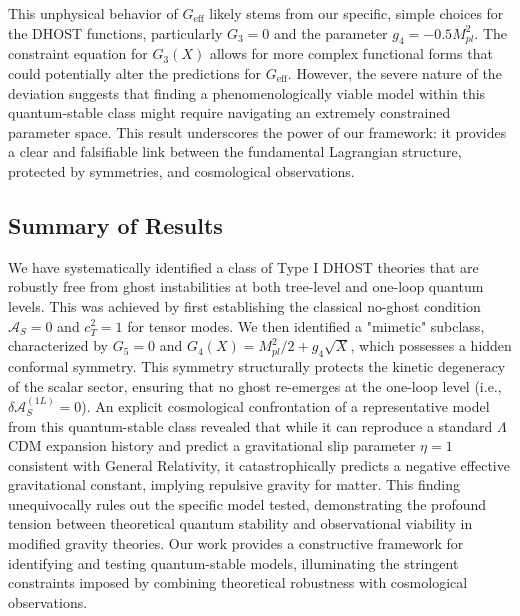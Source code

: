 \documentclass[twocolumn]{aastex631}
\begin{document}
This unphysical behavior of $G_{\text{eff}}$ likely stems from our specific, simple choices for the DHOST functions, particularly $G_3=0$ and the parameter $g_4 = -0.5 M_{pl}^2$. The constraint equation for $G_3(X)$ allows for more complex functional forms that could potentially alter the predictions for $G_{\text{eff}}$. However, the severe nature of the deviation suggests that finding a phenomenologically viable model within this quantum-stable class might require navigating an extremely constrained parameter space. This result underscores the power of our framework: it provides a clear and falsifiable link between the fundamental Lagrangian structure, protected by symmetries, and cosmological observations.

\subsection{Summary of Results}
We have systematically identified a class of Type I DHOST theories that are robustly free from ghost instabilities at both tree-level and one-loop quantum levels. This was achieved by first establishing the classical no-ghost condition $\mathcal{A}_S=0$ and $c_T^2=1$ for tensor modes. We then identified a "mimetic" subclass, characterized by $G_5=0$ and $G_4(X) = M_{pl}^2/2 + g_4\sqrt{X}$, which possesses a hidden conformal symmetry. This symmetry structurally protects the kinetic degeneracy of the scalar sector, ensuring that no ghost re-emerges at the one-loop level (i.e., $\delta\mathcal{A}_S^{(1L)}=0$). An explicit cosmological confrontation of a representative model from this quantum-stable class revealed that while it can reproduce a standard $\Lambda$CDM expansion history and predict a gravitational slip parameter $\eta=1$ consistent with General Relativity, it catastrophically predicts a negative effective gravitational constant, implying repulsive gravity for matter. This finding unequivocally rules out the specific model tested, demonstrating the profound tension between theoretical quantum stability and observational viability in modified gravity theories. Our work provides a constructive framework for identifying and testing quantum-stable models, illuminating the stringent constraints imposed by combining theoretical robustness with cosmological observations.
\end{document}
